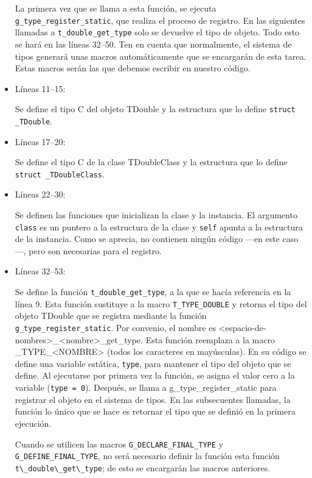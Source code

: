 \begin{itemize}
  La primera vez que se llama a esta función, se ejecuta \texttt{g\_type\_register\_static}, que realiza el
  proceso de registro. En las siguientes llamadas a \texttt{t\_double\_get\_type} solo se devuelve el tipo de objeto.
  Todo esto se hará en las líneas 32--50.
  Ten en cuenta que normalmente, el sistema de tipos generará unas macros automáticamente que se encargarán
  de esta tarea. Estas macros serán las que debemos escribir en nuestro código.
\item Líneas 11--15:\par
  Se define el tipo C del objeto \textsf{TDouble} y la estructura que lo define \texttt{struct \_TDouble}.
\item Líneas 17--20:\par
  Se define el tipo C de la clase \textsf{TDoubleClass} y la estructura que lo define \texttt{struct \_TDoubleClass}.
\item Líneas 22--30:\par
  Se definen las funciones que inicializan la clase y la instancia. El argumento \texttt{class} es un puntero a
  la estructura de la clase y \texttt{self} apunta a la estructura de la instancia.
  Como se aprecia, no contienen ningún código ---en este caso---, pero son necesarias para el registro.
\item Líneas 32--53:\par
  Se define la función \texttt{t\_double\_get\_type}, a la que se hacía referencia en la línea 9.
  Esta función sustituye a la macro \texttt{T\_TYPE\_DOUBLE} y retorna el tipo del objeto \textsf{TDouble}
  que se registra mediante la función \texttt{g\_type\_register\_static}.
  Por convenio, el nombre es \textsf{<espacio-de-nombres>\_<nombre>\_get\_type}. Esta función reemplaza
  a la macro \textsf{\_TYPE\_<NOMBRE>} (todos los caracteres en mayúsculas).
  En su código se define una variable estática, \texttt{type}, para mantener el tipo del objeto que se define.
  Al ejecutarse por primera vez la función, se asigna el valor cero a la variable (\texttt{type = 0}).
  Después, se llama a g\_type\_register\_static para registrar el objeto en el sistema de tipos. En las subsecuentes
  llamadas, la función lo único que se hace es retornar el tipo que se definió en la primera ejecución.\par
  Cuando se utilicen las macros \texttt{G\_DECLARE\_FINAL\_TYPE} y \texttt{G\_DEFINE\_FINAL\_TYPE}, no será
  necesario definir la función esta función \passthrough{\lstinline!t\_double\_get\_type!}; de esto se encargarán las macros anteriores.

\end{itemize}
